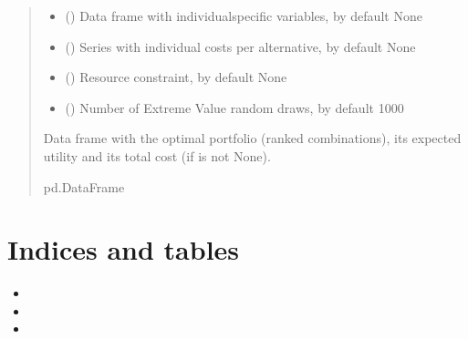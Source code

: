\documentclass[a4paper,10pt,english]{sphinxhowto}
\begin{document}
\begin{fulllineitems}
\begin{fulllineitems}
\begin{quote}
\begin{description}
\begin{itemize}
\item {} 
\sphinxAtStartPar
{} (\sphinxstyleliteralemphasis{\sphinxupquote{, }}) \textendash{} Data frame with individual\sphinxhyphen{}specific variables, by default None

\item {} 
\sphinxAtStartPar
{} (\sphinxstyleliteralemphasis{\sphinxupquote{, }}) \textendash{} Series with individual costs per alternative, by default None

\item {} 
\sphinxAtStartPar
{} (\sphinxstyleliteralemphasis{\sphinxupquote{, }}) \textendash{} Resource constraint, by default None

\item {} 
\sphinxAtStartPar
{} (\sphinxstyleliteralemphasis{\sphinxupquote{, }}) \textendash{} Number of Extreme Value random draws, by default 1000

\end{itemize}

\sphinxAtStartPar
{} \textendash{} Data frame with the optimal portfolio (ranked combinations),
its expected utility and its total cost (if  is not None).

\sphinxAtStartPar
pd.DataFrame

\end{description}\end{quote}

\end{fulllineitems}


\end{fulllineitems}



\section{Indices and tables}
\label{\detokenize{index:indices-and-tables}}\begin{itemize}
\item {} 
\sphinxAtStartPar
{}

\item {} 
\sphinxAtStartPar
{}

\item {} 
\sphinxAtStartPar
{}

\end{itemize}



\renewcommand{\indexname}{Index}
\printindex
\end{document}
